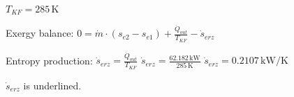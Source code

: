 \( T_{KF} = 285 \, \text{K} \)  

Exergy balance:  
\( 0 = \dot{m} \cdot (s_{e2} - s_{e1}) + \frac{\dot{Q}_{out}}{T_{KF}} - \dot{s}_{erz} \)  

Entropy production:  
\( \dot{s}_{erz} = \frac{\dot{Q}_{out}}{T_{KF}} \)  
\( \dot{s}_{erz} = \frac{62.182 \, \text{kW}}{285 \, \text{K}} \)  
\( \dot{s}_{erz} = 0.2107 \, \text{kW/K} \)  

\( \dot{s}_{erz} \) is underlined.